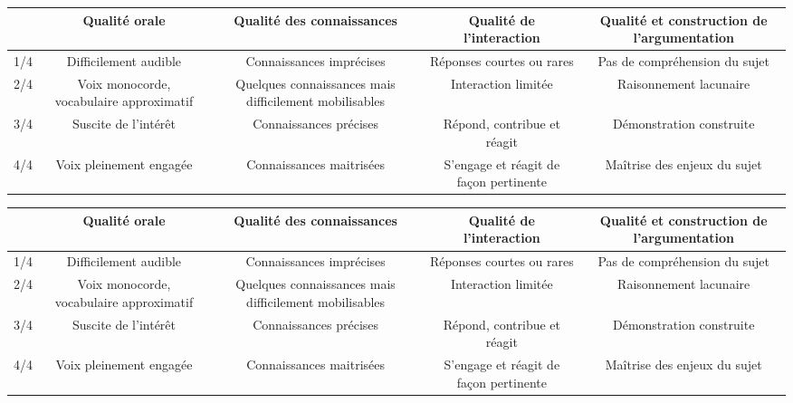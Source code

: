 \nomPrenomClasse
\begin{center}
    \begin{tabular}{|C{0.07}|C{0.2}|C{0.2}|C{0.2}|C{0.2}|}
        \hline
        & Qualité orale & Qualité des connaissances & Qualité de l'interaction & Qualité et construction de l'argumentation \\
        \hline
        1/4 & Difficilement audible & Connaissances imprécises & Réponses courtes ou rares & Pas de compréhension du sujet \\
        \hline 
        2/4 & Voix monocorde, vocabulaire approximatif & Quelques connaissances mais difficilement mobilisables & Interaction limitée & Raisonnement lacunaire \\ 
        \hline
        3/4 & Suscite de l'intérêt & Connaissances précises & Répond, contribue et réagit & Démonstration construite \\ 
        \hline
        4/4 & Voix pleinement engagée & Connaissances maitrisées & S'engage et réagit de façon pertinente & Maîtrise des enjeux du sujet \\
        \hline
    \end{tabular}
\end{center}
\vspace{1cm}

\nomPrenomClasse
\begin{center}
    \begin{tabular}{|C{0.07}|C{0.2}|C{0.2}|C{0.2}|C{0.2}|}
        \hline
        & Qualité orale & Qualité des connaissances & Qualité de l'interaction & Qualité et construction de l'argumentation \\
        \hline
        1/4 & Difficilement audible & Connaissances imprécises & Réponses courtes ou rares & Pas de compréhension du sujet \\
        \hline 
        2/4 & Voix monocorde, vocabulaire approximatif & Quelques connaissances mais difficilement mobilisables & Interaction limitée & Raisonnement lacunaire \\ 
        \hline
        3/4 & Suscite de l'intérêt & Connaissances précises & Répond, contribue et réagit & Démonstration construite \\ 
        \hline
        4/4 & Voix pleinement engagée & Connaissances maitrisées & S'engage et réagit de façon pertinente & Maîtrise des enjeux du sujet \\
        \hline
    \end{tabular}
\end{center}
